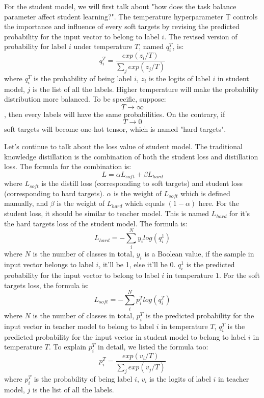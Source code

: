 \documentclass[conference]{IEEEtran}
\begin{document}
  For the student model, we will first talk about "how does the task balance parameter affect student learning?".
  The temperature hyperparameter T controls the importance and influence of every soft targets by revising the predicted probability for the input vector to belong to label $i$. The revised version of probability for label $i$ under temperature $T$, named $q_{i}^{T}$, is:
  $$q_{i}^{T}=\frac{exp(z_{i}/T)}{\sum_{j}exp(z_{j}/T)}$$
  where $q_{i}^{T}$ is the probability of being label $i$, $z_{i}$ is the logits of label $i$ in student model, $j$ is the list of all the labels.
  Higher temperature will make the probability distribution more balanced. To be specific, suppose: $$T\to \infty $$, then every labels will have the same probabilities. 
  On the contrary, if $$T\to 0 $$ soft targets will become one-hot tensor, which is named "hard targets".\par
  Let's continue to talk about the loss value of student model. The traditional knowledge distillation is the combination of both the student loss and distillation loss.
  The formula for the combination is:
  $$L=\alpha L_{soft}+\beta L_{hard}$$
  where $L_{soft}$ is the distill loss (corresponding to soft targets) and student loss (corresponding to hard targets). $\alpha$ is the weight of $L_{soft}$ which is defined manually, and $\beta$ is the weight of $L_{hard}$ which equals $(1-\alpha)$ here.
  For the student loss, it should be similar to teacher model. This is named $L_{hard}$ for it's the hard targets loss of the student model. The formula is:
  $$L_{hard}=-\sum_{i}^{N}y_{i}log(q_{i}^{1})$$
  where $N$ is the number of classes in total, $y_{i}$ is a Boolean value, if the sample in input vector belongs to label $i$, it'll be 1, else it'll be 0. $q_{i}^{1}$ is the predicted probability for the input vector to belong to label $i$ in temperature $1$.
  For the soft targets loss, the formula is:
  $$L_{soft}=-\sum_{i}^{N}p_{i}^{T}log(q_{i}^{T})$$
  where $N$ is the number of classes in total, $p_{i}^{T}$ is the predicted probability for the input vector in teacher model to belong to label $i$ in temperature $T$, $q_{i}^{T}$ is the predicted probability for the input vector in student model to belong to label $i$ in temperature $T$.
  To explain $p_{i}^{T}$ in detail, we listed the formula too:
  $$p_{i}^{T}=\frac{exp(v_{i}/T)}{\sum_{j}exp(v_{j}/T)}$$
  where $p_{i}^{T}$ is the probability of being label $i$, $v_{i}$ is the logits of label $i$ in teacher model, $j$ is the list of all the labels.
\end{document}
